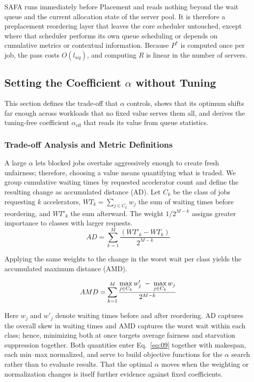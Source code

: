 \documentclass{ieeetj}
\begin{document}
SAFA runs immediately before Placement and reads nothing beyond the wait queue and the current allocation state of the server pool. It is therefore a preplacement reordering layer that leaves the core scheduler untouched, except where that scheduler performs its own queue scheduling or depends on cumulative metrics or contextual information. Because $P^*$ is computed once per job, the pass costs $O(l_{wq})$, and computing $R$ is linear in the number of servers.

\subsection{Setting the Coefficient $\alpha$ without Tuning}\label{sec:coeff}
This section defines the trade-off that $\alpha$ controls, shows that its optimum shifts far enough across workloads that no fixed value serves them all, and derives the tuning-free coefficient $\alpha_{\text{eff}}$ that reads its value from queue statistics.

\subsubsection{Trade-off Analysis and Metric Definitions}
A large $\alpha$ lets blocked jobs overtake aggressively enough to create fresh unfairness; therefore, choosing a value means quantifying what is traded. We group cumulative waiting times by requested accelerator count and define the resulting change as accumulated distance (AD). Let $C_k$ be the class of jobs requesting $k$ accelerators, $WT_k=\sum_{j\in C_k} w_j$ the sum of waiting times before reordering, and $WT'_k$ the sum afterward. The weight $1/2^{M-k}$ assigns greater importance to classes with larger requests.
\begin{equation}
AD = \sum_{k=1}^{M} \frac{(WT'_k - WT_k)}{2^{M-k}}
\label{eq:07}
\end{equation}

Applying the same weights to the change in the worst wait per class yields the accumulated maximum distance (AMD).

\begin{equation}
AMD = \sum_{k=1}^{M} \frac{\max\limits_{j\in C_k} w'_j \;-\; \max\limits_{j\in C_k} w_j}{2^{M-k}}
\label{eq:08}
\vspace{2pt}
\end{equation}

Here $w_j$ and $w'_j$ denote waiting times before and after reordering. AD captures the overall skew in waiting times and AMD captures the worst wait within each class; hence, minimizing both at once targets average fairness and starvation suppression together. Both quantities enter Eq.~\eqref{eq:09} together with makespan, each min--max normalized, and serve to build objective functions for the $\alpha$ search rather than to evaluate results. That the optimal $\alpha$ moves when the weighting or normalization changes is itself further evidence against fixed coefficients.
\end{document}
